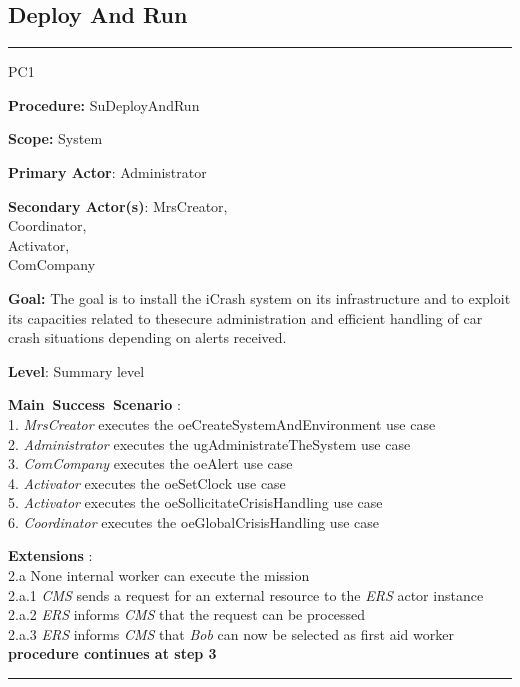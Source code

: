 \subsection{Deploy And Run}
\vspace{0.5cm}
\hrule
\begin{lyxlist}{PC1}
\small{
\item [\textbf{Procedure:}] SuDeployAndRun
\item [\textbf{Scope:}] System
\item [\textbf{Primary Actor}:] Administrator
\item [\textbf{Secondary Actor(s)}:] MrsCreator,\\
                  Coordinator, \\
                  Activator, \\
                  ComCompany
\item [\textbf{Goal:}] The goal is to install the iCrash system on its infrastructure and to exploit its capacities related to thesecure administration and efficient handling of car crash situations depending on alerts received.
\item [\textbf{Level}:] Summary level
\item [\textbf{Main~Success~Scenario}]:\\
1. \emph{MrsCreator} executes the oeCreateSystemAndEnvironment use case\\
2. \emph{Administrator} executes the ugAdministrateTheSystem use case\\
3. \emph{ComCompany} executes the oeAlert use case\\
4. \emph{Activator} executes the oeSetClock use case\\
5. \emph{Activator} executes the oeSollicitateCrisisHandling use case\\
6. \emph{Coordinator} executes the oeGlobalCrisisHandling use case\\


\item [\textbf{Extensions}]:\\
2.a None internal worker can execute the mission\\
\hspace*{0.5cm} 2.a.1 \emph{CMS} sends a request for an external resource to the \emph{ERS} actor instance\\
\hspace*{0.5cm} 2.a.2 \emph{ERS} informs \emph{CMS} that the request can be processed\\
\hspace*{0.5cm} 2.a.3 \emph{ERS} informs \emph{CMS} that \emph{Bob} can now be selected as first aid worker\\
\hspace*{0.5cm} \textbf{procedure continues at step 3}

}

\end{lyxlist}
\hrule
\vspace{0.5cm}



